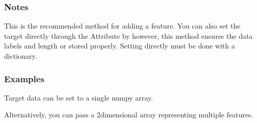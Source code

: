 \documentclass[letterpaper,10pt,english]{sphinxmanual}
\begin{document}
\begin{fulllineitems}
\begin{description}
\end{description}


\subsubsection*{Notes}

\sphinxAtStartPar
This is the recommended method for adding a feature.
You can also set the target directly through the
Attribute  by 
however, this method ensures the data labels and length or stored
properly.
Setting  directly must be done with a dictionary.
\subsubsection*{Examples}

\sphinxAtStartPar
Target data can be set to a single numpy array.

\begin{sphinxVerbatim}[commandchars=\\\{\}]
   
 
  
  
\end{sphinxVerbatim}

\sphinxAtStartPar
Alternatively, you can pass a 2\sphinxhyphen{}dimensional array representing
multiple features.

\begin{sphinxVerbatim}[commandchars=\\\{\}]
  
  
\end{sphinxVerbatim}

\end{fulllineitems}
\end{document}
